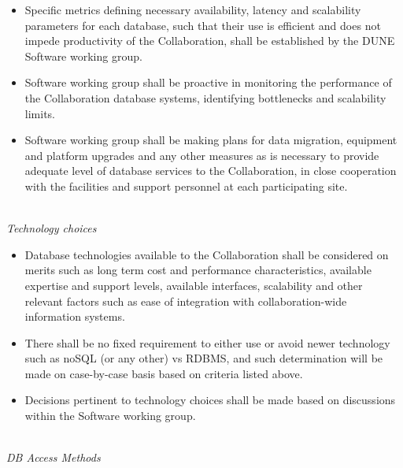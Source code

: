 \begin{itemize}
\item Specific metrics defining necessary availability, latency and scalability parameters for each database, such that their use is efficient and does not impede productivity of the Collaboration,  shall be established by the DUNE Software working group.

\item Software working group shall be proactive in monitoring the performance of the Collaboration database systems, identifying bottlenecks and scalability limits.

\item Software working group shall be making plans for data migration, equipment and platform upgrades and any other measures as is 
necessary to provide adequate level of database services to the Collaboration, in close cooperation with the facilities 
and support personnel at each participating site.
\end{itemize}
\ 
\\
\textit{Technology choices}
\begin{itemize}
\item Database technologies available to the Collaboration shall be considered on merits such as long term cost and 
performance characteristics, available expertise and support levels, available interfaces, scalability and other relevant 
factors such as ease of integration with collaboration-wide information systems.

\item There shall be no fixed requirement to either use or avoid newer technology such as noSQL (or any other) vs RDBMS, 
and such determination will be made on case-by-case basis based on criteria listed above.


\item Decisions pertinent to technology choices shall be made based on discussions within the Software working group.
\end{itemize}
\ 
\\
\textit{DB Access Methods}


